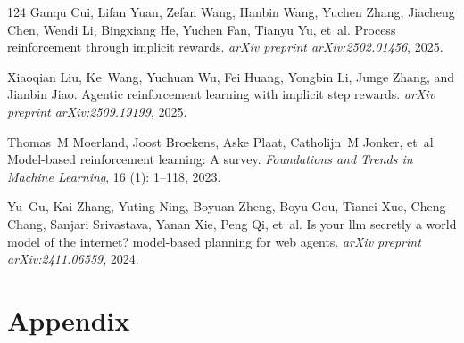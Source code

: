 \documentclass[]{youtu} %
\begin{document}
\begin{thebibliography}{124}
Ganqu Cui, Lifan Yuan, Zefan Wang, Hanbin Wang, Yuchen Zhang, Jiacheng Chen, Wendi Li, Bingxiang He, Yuchen Fan, Tianyu Yu, et~al.
\newblock Process reinforcement through implicit rewards.
\newblock \emph{arXiv preprint arXiv:2502.01456}, 2025{}.

Xiaoqian Liu, Ke~Wang, Yuchuan Wu, Fei Huang, Yongbin Li, Junge Zhang, and Jianbin Jiao.
\newblock Agentic reinforcement learning with implicit step rewards.
\newblock \emph{arXiv preprint arXiv:2509.19199}, 2025{}.

Thomas~M Moerland, Joost Broekens, Aske Plaat, Catholijn~M Jonker, et~al.
\newblock Model-based reinforcement learning: A survey.
\newblock \emph{Foundations and Trends{\textregistered} in Machine Learning}, 16 (1): 1--118, 2023.

Yu~Gu, Kai Zhang, Yuting Ning, Boyuan Zheng, Boyu Gou, Tianci Xue, Cheng Chang, Sanjari Srivastava, Yanan Xie, Peng Qi, et~al.
\newblock Is your llm secretly a world model of the internet? model-based planning for web agents.
\newblock \emph{arXiv preprint arXiv:2411.06559}, 2024.

\end{thebibliography}


\clearpage
\newpage
\appendix
\section{Appendix}
\end{document}
